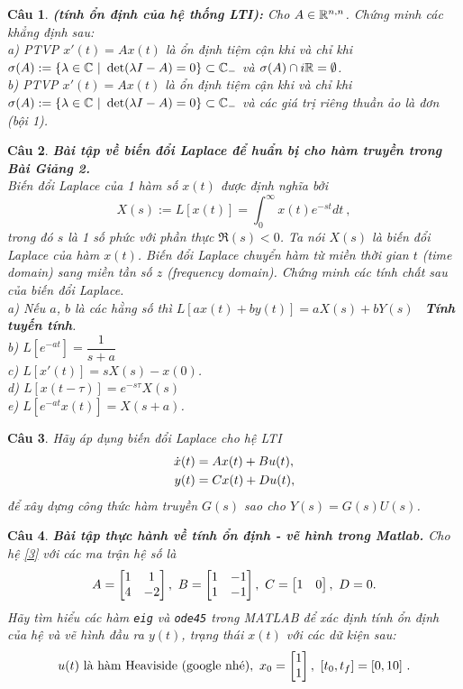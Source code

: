 \documentclass[11pt]{article}
\newtheorem{bt}{Câu}
\begin{document}
\newpage 

\begin{bt} \textbf{(tính ổn định của hệ thống LTI):} Cho $A \in \mathbb{R}^{n,n}$. Chứng minh các khẳng định sau: \\
a) PTVP $x'(t) = Ax(t)$ là ổn định tiệm cận khi và chỉ khi $\sigma(A) := \{ \lambda \in \mathbb{C} \ | \ \det(\lambda I-A) = 0\} \subset \mathbb{C}_{-}$ và $\sigma(A) \cap i\mathbb{R} = \emptyset$. \\
b) PTVP $x'(t) = Ax(t)$ là ổn định tiệm cận khi và chỉ khi $\sigma(A) := \{ \lambda \in \mathbb{C} \ | \ \det(\lambda I-A) = 0\} \subset \mathbb{C}_{-}$ và các giá trị riêng thuần ảo là đơn (bội 1).
\end{bt}   

\begin{bt} \textbf{Bài tập về biến đổi Laplace để huẩn bị cho hàm truyền trong Bài Giảng 2.} \\
Biến đổi Laplace của 1 hàm số $x(t)$ được định nghĩa bởi
%
\[
X(s) := L[x(t)] = \int_0^{\infty} x(t) e^{-st} dt \ , 
\]
%
trong đó $s$ là 1 số phức với phần thực $\Re(s)<0$. Ta nói $X(s)$ là biến đổi Laplace của hàm $x(t)$. Biến đổi Laplace chuyển hàm từ miền thời gian $t$ (time domain) sang miền tần số $z$ (frequency domain). Chứng minh các tính chất sau của biến đổi Laplace. \\
a) Nếu $a$, $b$ là các hằng số thì $L[ax(t) + by(t)] = a X(s) + b Y(s)$ \ \textbf{Tính tuyến tính}. \\
b) $L[e^{-at}] = \dfrac{1}{s+a}$ \\
c) $L[x'(t)] = s X(s) - x(0)$. \\
d) $L[x(t-\tau)] = e^{-s\tau} X(s)$ \\
e) $L[e^{-at} x(t)] = X(s+a)$. 
\end{bt}   

\begin{bt}
Hãy áp dụng biến đổi Laplace cho hệ LTI 
%
\begin{align}\label{3}
\dot{x}(t) &= A x(t) + B u(t), \notag \\
y(t) &= Cx(t) + Du(t),
\end{align}
%
để xây dựng công thức hàm truyền $G(s)$ sao cho $Y(s) = G(s) U(s)$.
\end{bt}

\begin{bt} \textbf{Bài tập thực hành về tính ổn định - vẽ hình trong Matlab.}
Cho hệ \eqref{3} với các ma trận hệ số là 
%
\[
A = \m{1 & 1 \\ 4 & -2}, \ B = \m{1 & -1 \\ 1 & -1}, \ C = \m{1 & 0}, \ D = 0. 
\]
%
Hãy tìm hiểu các hàm \verb|eig| và \verb|ode45| trong MATLAB để xác định tính ổn định của hệ và vẽ hình 
đầu ra $y(t)$, trạng thái $x(t)$ với các dữ kiện sau:
%
\[
u(t) \mbox{ là hàm Heaviside (google nhé)}, \ x_0 = \m{1 \\ 1}, \ [t_0,t_f] = [0,10] \ .
\]
% 
\end{bt}
\end{document}
